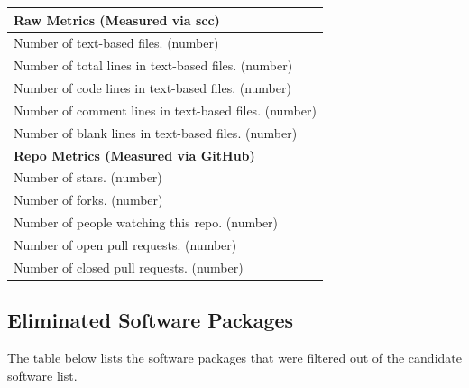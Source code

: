 \documentclass[12pt, notitlepage]{article}
\begin{document}
\begin{singlespace}
\def\arraystretch{1.4}
\begin{tabular}{p{16cm}}
	\hline		
	\textbf{Raw Metrics (Measured via scc)}\\
	\hline
	Number of text-based files. (number)\\
	Number of total lines in text-based files. (number)\\
	Number of code lines in text-based files. (number)\\
	Number of comment lines in text-based files. (number)\\
	Number of blank lines in text-based files. (number)\\
	\hline
	\textbf{Repo Metrics (Measured via GitHub)}\\
	\hline
	Number of stars. (number)\\
	Number of forks. (number)\\
	Number of people watching this repo. (number)\\
	Number of open pull requests. (number)\\
	Number of closed pull requests. (number)\\
	\hline
\end{tabular}

\newpage

\subsection{Eliminated Software Packages}\label{eliminatedpackagessection}

The table below lists the software packages that were filtered out of the candidate software list. 


\end{singlespace}
\end{document}
